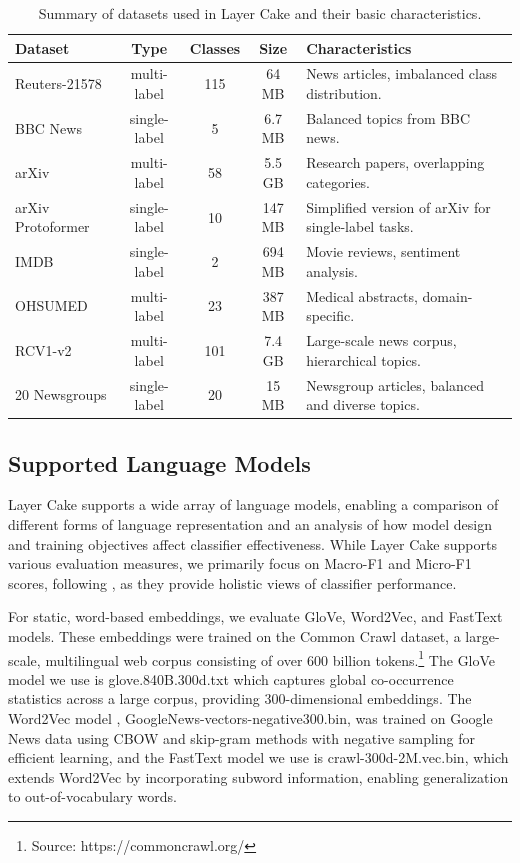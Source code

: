 \documentclass[final]{clv2025-revised}
\begin{document}
\sloppy
\begin{table}[h!]
\centering
\caption{Summary of datasets used in Layer Cake and their basic characteristics.}
\label{tab1}
\scriptsize
\begin{tabularx}{\textwidth}{l c c c X}
\toprule
\textbf{Dataset} & \textbf{Type} & \textbf{Classes} & \textbf{Size} & \textbf{Characteristics} \\
\midrule
Reuters-21578 & multi-label & 115 & 64 MB & News articles, imbalanced class distribution. \\
BBC News & single-label & 5 & 6.7 MB & Balanced topics from BBC news. \\
arXiv & multi-label & 58 & 5.5 GB & Research papers, overlapping categories. \\
arXiv Protoformer & single-label & 10 & 147 MB & Simplified version of arXiv for single-label tasks. \\
IMDB & single-label & 2 & 694 MB & Movie reviews, sentiment analysis. \\
OHSUMED & multi-label & 23 & 387 MB & Medical abstracts, domain-specific. \\
RCV1-v2 & multi-label & 101 & 7.4 GB & Large-scale news corpus, hierarchical topics. \\
20 Newsgroups & single-label & 20 & 15 MB & Newsgroup articles, balanced and diverse topics. \\
\bottomrule
\end{tabularx}
\end{table}


\subsection{Supported Language Models}

Layer Cake supports a wide array of language models, enabling a comparison of different forms of language representation and an analysis of how model design and training objectives affect classifier effectiveness. While Layer Cake supports various evaluation measures, we primarily focus on Macro-F1 and Micro-F1 scores, following \cite{moreo2021}, as they provide holistic views of classifier performance. 

For static, word-based embeddings, we evaluate GloVe, Word2Vec, and FastText models. These embeddings were trained on the Common Crawl dataset, a large-scale, multilingual web corpus consisting of over 600 billion tokens.\footnote{Source: https://commoncrawl.org/} The GloVe model \cite{pennington} we use is glove.840B.300d.txt which captures global co-occurrence statistics across a large corpus, providing 300-dimensional embeddings. The Word2Vec model \cite{mikolov}, GoogleNews-vectors-negative300.bin, was trained on Google News data using CBOW and skip-gram methods with negative sampling for efficient learning, and the FastText \cite{articleboja} model we use is crawl-300d-2M.vec.bin, which extends Word2Vec by incorporating subword information, enabling generalization to out-of-vocabulary words.
\end{document}

